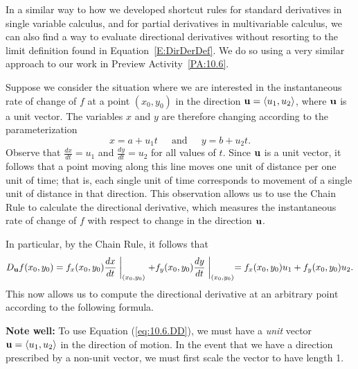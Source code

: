 In a similar way to how we developed shortcut rules for standard derivatives in single variable calculus, and for partial derivatives in multivariable calculus, we can also find a way to evaluate directional derivatives without resorting to the limit definition found in Equation~\eqref{E:DirDerDef}.  We do so using a very similar approach to our work in Preview Activity~\ref{PA:10.6}.

Suppose we consider the situation where we are interested in the instantaneous rate of change of $f$ at a point $(x_0,y_0)$ in the direction $\mathbf{u} = \langle u_1, u_2 \rangle$, where $\mathbf{u}$ is a unit vector.   The variables $x$ and $y$ are therefore changing according to the parameterization
\[x = a + u_1t \ \ \ \ \ \text{ and } \ \ \ \ \  y = b + u_2t.\]
Observe that $\frac{dx}{dt} = u_1$ and $\frac{dy}{dt} = u_2$ for all values of $t$.  Since $\mathbf{u}$ is a unit vector, it follows that a point moving along this line moves one unit of distance per one unit of time; that is, each single unit of time corresponds to movement of a single unit of distance in that direction.  This observation allows us to use the Chain Rule to calculate the directional derivative, which measures the instantaneous rate of change of $f$ with respect to change in the direction $\mathbf{u}$.

In particular, by the Chain Rule, it follows that 
\[D_{\mathbf{u}}f(x_0,y_0) = f_x(x_0,y_0)\frac{dx}{dt}\biggm|_{(x_0,y_0)} + f_y(x_0,y_0)\frac{dy}{dt}\biggm|_{(x_0,y_0)} = f_x(x_0,y_0)u_1 + f_y(x_0,y_0)u_2.\]
This now allows us to compute the directional derivative at an arbitrary point according to the following formula.

\vspace*{5pt}
\nin {}
\vspace*{5pt}

\noindent \textbf{Note well:} To use Equation (\ref{eq:10.6.DD}), we must have a \emph{unit} vector $\mathbf{u} = \langle u_1, u_2 \rangle$ in the direction of motion.  In the event that we have a direction prescribed by a non-unit vector, we must first scale the vector to have length 1.

